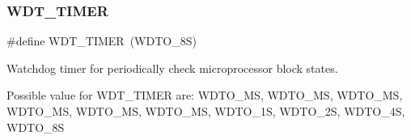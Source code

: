 \subsubsection{\texorpdfstring{W\+D\+T\+\_\+\+T\+I\+M\+ER}{WDT\_TIMER}}
{\footnotesize\ttfamily \#define W\+D\+T\+\_\+\+T\+I\+M\+ER~(W\+D\+T\+O\+\_\+8S)}



Watchdog timer for periodically check microprocessor block states. 

Possible value for W\+D\+T\+\_\+\+T\+I\+M\+ER are\+: W\+D\+T\+O\+\_\+MS, W\+D\+T\+O\+\_\+MS, W\+D\+T\+O\+\_\+MS, W\+D\+T\+O\+\_\+MS, W\+D\+T\+O\+\_\+MS, W\+D\+T\+O\+\_\+MS, W\+D\+T\+O\+\_\+1S, W\+D\+T\+O\+\_\+2S, W\+D\+T\+O\+\_\+4S, W\+D\+T\+O\+\_\+8S 